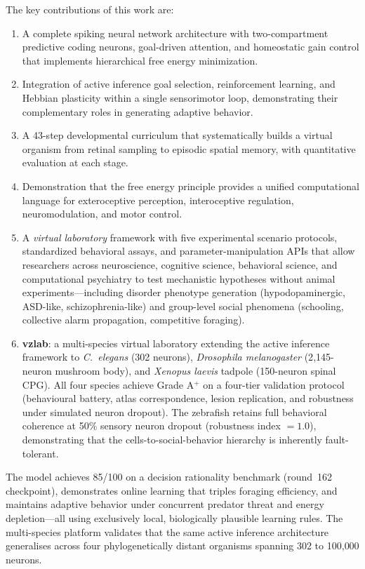 \documentclass[12pt]{article}
\begin{document}
The key contributions of this work are:
\begin{enumerate}[nosep]
  \item A complete spiking neural network architecture with
    two-compartment predictive coding neurons, goal-driven attention,
    and homeostatic gain control that implements hierarchical free
    energy minimization.
  \item Integration of active inference goal selection, reinforcement
    learning, and Hebbian plasticity within a single sensorimotor loop,
    demonstrating their complementary roles in generating adaptive
    behavior.
  \item A 43-step developmental curriculum that systematically builds
    a virtual organism from retinal sampling to episodic spatial memory,
    with quantitative evaluation at each stage.
  \item Demonstration that the free energy principle provides a unified
    computational language for exteroceptive perception, interoceptive
    regulation, neuromodulation, and motor control.
  \item A \emph{virtual laboratory} framework with five experimental
    scenario protocols, standardized behavioral assays, and
    parameter-manipulation APIs that allow researchers across
    neuroscience, cognitive science, behavioral science, and
    computational psychiatry to test mechanistic hypotheses without
    animal experiments---including disorder phenotype generation
    (hypodopaminergic, ASD-like, schizophrenia-like) and group-level
    social phenomena (schooling, collective alarm propagation,
    competitive foraging).
  \item \textbf{vzlab}: a multi-species virtual laboratory extending the
    active inference framework to \textit{C.~elegans} (302 neurons),
    \textit{Drosophila melanogaster} (2{,}145-neuron mushroom body), and
    \textit{Xenopus laevis} tadpole (150-neuron spinal CPG).
    All four species achieve Grade A$^+$ on a four-tier validation
    protocol (behavioural battery, atlas correspondence, lesion
    replication, and robustness under simulated neuron dropout).
    The zebrafish retains full behavioral coherence at 50\% sensory
    neuron dropout (robustness index $= 1.0$), demonstrating that the
    cells-to-social-behavior hierarchy is inherently fault-tolerant.
\end{enumerate}

The model achieves 85/100 on a decision rationality benchmark (round~162 checkpoint),
demonstrates online learning that triples
foraging efficiency, and maintains adaptive behavior under concurrent
predator threat and energy depletion---all using exclusively local,
biologically plausible learning rules.
The multi-species platform validates that the same active inference
architecture generalises across four phylogenetically distant
organisms spanning 302 to 100{,}000 neurons.
\end{document}
